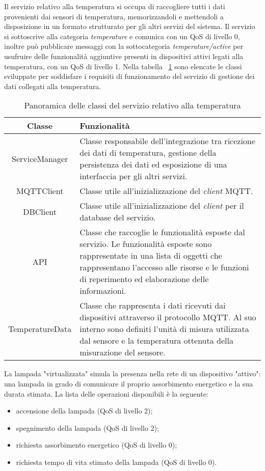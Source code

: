 
Il servizio relativo alla temperatura si occupa di raccogliere tutti i dati provenienti dai sensori di temperatura, memorizzandoli e mettendoli a disposizione in un formato strutturato per gli altri servizi del sistema.
Il servizio si sottoscrive alla categoria \emph{temperature} e comunica con un QoS di livello 0, inoltre può pubblicare messaggi con la sottocategoria \emph{temperature/active} per usufruire delle funzionalità aggiuntive presenti in dispositivi attivi legati alla temperatura, con un QoS di livello 1.
Nella tabella ~\ref{tab:classi-temperatura} sono elencate le classi sviluppate per soddisfare i requisiti di funzionamento del servizio di gestione dei dati collegati alla temperatura.


\begin{table}[!h]
\caption{Panoramica delle classi del servizio relativo alla temperatura}
\label{tab:classi-temperatura}
\begin{tabularx}{\linewidth}{|c|X|}
\hline
\textbf{Classe} & \textbf{Funzionalità} \\
\hline
ServiceManager & Classe responsabile dell'integrazione tra ricezione dei dati di temperatura, gestione della persistenza dei dati ed esposizione di una interfaccia per gli altri servizi. \\
\hline
MQTTClient & Classe utile all'inizializzazione del \emph{client} MQTT. \\
\hline
DBClient & Classe utile all'inizializzazione del \emph{client} per il database del servizio. \\
\hline
API & Classe che raccoglie le funzionalità esposte dal servizio. Le funzionalità esposte sono rappresentate in una lista di oggetti che rappresentano l'accesso alle risorse e le funzioni di reperimento ed elaborazione delle informazioni. \\
\hline
TemperatureData & Classe che rappresenta i dati ricevuti dai dispositivi attraverso il protocollo MQTT. Al suo interno sono definiti l'unità di misura utilizzata dal sensore e la temperatura ottenuta della misurazione del sensore. \\
\hline
\end{tabularx}
\end{table}


La lampada "virtualizzata" simula la presenza nella rete di un dispositivo "attivo": una lampada in grado di comunicare il proprio assorbimento energetico e la sua durata stimata.
La lista delle operazioni disponibili è la seguente:
\begin{itemize}
	\item accensione della lampada (QoS di livello 2);
	\item spegnimento della lampada (QoS di livello 2);
	\item richiesta assorbimento energetico (QoS di livello 0);
	\item richiesta tempo di vita stimato della lampada (QoS di livello 0).
\end{itemize}

